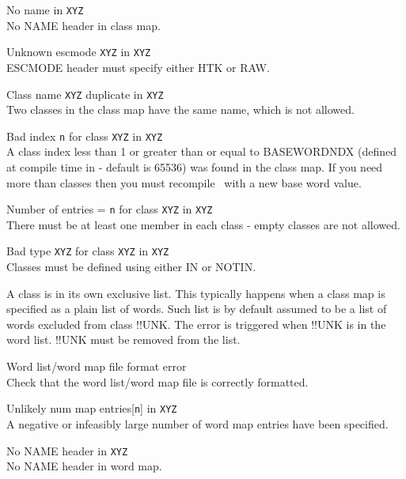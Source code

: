 \begin{itemize}
\begin{itemize}
 No name in \texttt{XYZ}\\
        No NAME header in class map.

 Unknown escmode \texttt{XYZ} in \texttt{XYZ}\\
        ESCMODE header must specify either HTK or RAW.

 Class name  \texttt{XYZ} duplicate in \texttt{XYZ}\\
        Two classes in the class map have the same name, which is not allowed.

 Bad index \texttt{n} for class \texttt{XYZ} in \texttt{XYZ}\\
        A class index less than 1 or greater than or equal to BASEWORDNDX (defined
        at compile time in  - default is 65536) was found
        in the class map.  If you need more than 
        classes then you must recompile \HTK\ with a new base word
        value.

 Number of entries =  \texttt{n} for class \texttt{XYZ} in \texttt{XYZ}\\
        There must be at least one member in each class - empty
        classes are not allowed.

 Bad type \texttt{XYZ} for class \texttt{XYZ} in \texttt{XYZ}\\
        Classes must be defined using either IN or NOTIN.

 A class is in its own exclusive list. This typically happens when a class map 
              is specified as a plain list of words. Such list is by default assumed to be 
              a list of words excluded from class !!UNK. The error is triggered when !!UNK
              is in the word list. !!UNK must be removed from the list.

\end{itemize}



\begin{itemize}
   Word list/word map file format error\\
        Check that the word list/word map file is correctly formatted.

  Unlikely num map entries[\texttt{n}] in \texttt{XYZ}\\
        A negative or infeasibly large number of word map entries
        have been specified.

 No NAME header in \texttt{XYZ}\\
        No NAME header in word map.


\end{itemize}
\end{itemize}
